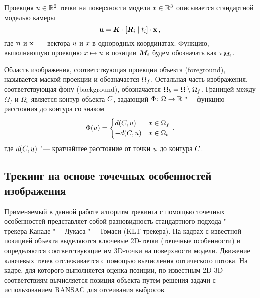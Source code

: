 Проекция $\mathnormal{u} \in \mathbb{R}^2$ точки на поверхности модели
$\mathnormal{x} \in \mathbb{R}^3$ описывается стандартной моделью камеры
\begin{equation}\label{eqn:proj}
    \mathbf{u} = \bm{K} \cdot [\bm{R}_i \mid \mathnormal{t}_i] \cdot \mathbf{x}
    \,\text{,}
\end{equation}
где $\mathbf{u}$ и $\mathbf{x}$~--- вектора $\mathnormal{u}$ и $\mathnormal{x}$ в однородных
координатах. Функцию, выполняющую проекцию $\mathnormal{x} \mapsto \mathnormal{u}$ в
позиции $\bm{M}_i$ будем обозначать как $\pi_{\bm{M}_i}$.

Область изображения, соответствующая проекции объекта (foreground), называется
маской проекции и обозначается $\Omega_f$.
Остальная часть изображения, соответствующая фону (background), обозначается
$\Omega_b = \Omega \setminus \Omega_f$.
Границей между $\Omega_f$ и $\Omega_b$ является контур объекта $C$,
задающий
$\Phi \colon \Omega \to \mathbb{R}$ "---
функцию расстояния до контура со знаком
\begin{equation*}
    \Phi(\mathnormal{u}) =
    \begin{cases}
        d(C, \mathnormal{u})  & x \in \Omega_f \\
        -d(C, \mathnormal{u})  & x \in \Omega_b
    \end{cases}
    \,\text{,}
\end{equation*}
где $d(C, \mathnormal{u})$ "--- кратчайшее расстояние от точки $\mathnormal{u}$
до контура $C$.

\subsection{Трекинг на основе точечных особенностей изображения}

Применяемый в данной работе алгоритм трекинга с помощью точечных особенностей
представляет собой разновидность стандартного подхода "--- трекера
Канаде "--- Лукаса "--- Томаси
(KLT-трекера)\cite{LucasAndKanade,TomasiAndKanade,ShiAndTomasi,PyrLK}.
На кадрах с известной позицией объекта выделяются ключевые 2D-точки (точечные
особенности) и определяются соответствующие им 3D-точки на поверхности модели.
Движение ключевых точек отслеживается с помощью вычисления оптического потока.
На кадре, для которого выполняется оценка позиции, по известным 2D-3D
соответствиям вычисляется позиция объекта путем решения задачи
\PnP\cite{LepetitSurvey} с использованием RANSAC\cite{RANSAC} для отсеивания
выбросов.


